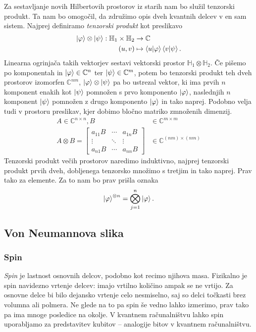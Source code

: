 \documentclass[mat1]{fmfdelo}
\newcommand{\C}{\mathbb C}
\newcommand{\Hb}{\mathbb H}
\begin{document}
Za sestavljanje novih Hilbertovih prostorov iz starih nam bo služil tenzorski produkt. Ta nam bo omogočil, da združimo opis dveh kvantnih delcev v en sam sistem. Najprej definiramo \emph{tenzorski produkt} kot preslikavo
\begin{align*}
    \ket\varphi \otimes \ket\psi : \Hb_1 \times \Hb_2 &\to \mathbb C\\
    (u,v) &\mapsto \braket{u}{\varphi} \braket{v}{\psi}.
\end{align*}
Linearna ogrinjača takih vektorjev sestavi vektorski prostor \(\Hb_1 \otimes \Hb_2\). Če pišemo po komponentah in \(\ket\varphi\in\C^n\) ter \(\ket\psi\in\C^m\), potem bo tenzorski produkt teh dveh prostorov izomorfen \(\C^{nm}\), \(\ket\varphi\otimes\ket\psi\) pa bo ustrezal vektor, ki ima prvih \(n\) komponent enakih kot \(\ket\psi\) pomnožen s prvo komponento \(\ket\varphi\), naslednjih \(n\) komponent \(\ket\psi\) pomnožen z drugo komponento \(\ket\varphi\) in tako naprej. Podobno velja tudi v prostoru preslikav, kjer dobimo bločno matriko zmnoženih dimenzij.
\begin{align*}
    A\in \C^{n\times n}, B&\in\C^{m\times m}\\
    A\otimes B = \begin{bmatrix}
        a_{11}B&\cdots&a_{1n}B\\
        \vdots&\ddots&\vdots\\
        a_{n1}B&\cdots&a_{nn}B
    \end{bmatrix}&\in \C^{(nm)\times (nm)}
\end{align*}
Tenzorski produkt večih prostorov naredimo induktivno, najprej tenzorski produkt prvih dveh, dobljenega tenzorsko množimo s tretjim in tako naprej. Prav tako za elemente. Za to nam bo prav prišla oznaka
\begin{align*}
    \ket{\varphi}^{\otimes n} = \bigotimes_{j=1}^n \ket\varphi.
\end{align*}

\subsection{Von Neumannova slika}
\subsubsection{Spin}
\emph{Spin} je lastnost osnovnih delcov, podobno kot recimo njihova masa. Fizikalno je spin navidezno vrtenje delcev: imajo vrtilno količino ampak se ne vrtijo. Za osnovne delce bi bilo dejansko vrtenje celo nesmiselno, saj so delci točkasti brez volumna ali polmera. Ne glede na to pa spin še vedno lahko izmerimo, prav tako pa ima mnoge posledice na okolje. V kvantnem računalništvu lahko spin uporabljamo za predstavitev kubitov -- analogije bitov v kvantnem računalništvu. 
\end{document}
